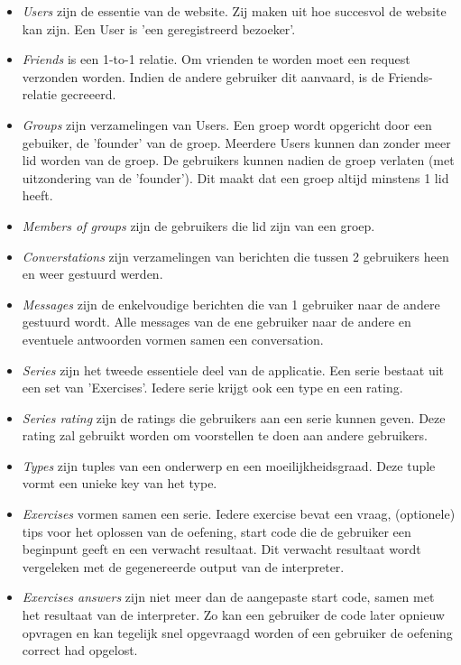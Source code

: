 \begin{itemize}
    \item \emph{Users} zijn de essentie van de website. Zij maken uit hoe succesvol de website kan zijn.
        Een User is 'een geregistreerd bezoeker'.
    \item \emph{Friends} is een 1-to-1 relatie. Om vrienden te worden moet een request verzonden worden.
        Indien de andere gebruiker dit aanvaard, is de Friends-relatie gecreeerd.
    \item \emph{Groups} zijn verzamelingen van Users. Een groep wordt opgericht door een gebuiker, de 'founder'
        van de groep. Meerdere Users kunnen dan zonder meer lid worden van de groep. De gebruikers kunnen
        nadien de groep verlaten (met uitzondering van de 'founder'). Dit maakt dat een groep altijd minstens
        1 lid heeft.
    \item \emph{Members of groups} zijn de gebruikers die lid zijn van een groep.
    \item \emph{Converstations} zijn verzamelingen van berichten die tussen 2 gebruikers heen en weer gestuurd
        werden.
    \item \emph{Messages} zijn de enkelvoudige berichten die van 1 gebruiker naar de andere gestuurd wordt.
        Alle messages van de ene gebruiker naar de andere en eventuele antwoorden vormen samen een conversation.
    \item \emph{Series} zijn het tweede essentiele deel van de applicatie. Een serie bestaat uit een set
        van 'Exercises'. Iedere serie krijgt ook een type en een rating.
    \item \emph{Series rating} zijn de ratings die gebruikers aan een serie kunnen geven. Deze rating
        zal gebruikt worden om voorstellen te doen aan andere gebruikers.
    \item \emph{Types} zijn tuples van een onderwerp en een moeilijkheidsgraad. Deze tuple vormt een
        unieke key van het type.
    \item \emph{Exercises} vormen samen een serie. Iedere exercise bevat een vraag, (optionele) tips voor
        het oplossen van de oefening, start code die de gebruiker een beginpunt geeft en een verwacht resultaat.
        Dit verwacht resultaat wordt vergeleken met de gegenereerde output van de interpreter.
    \item \emph{Exercises answers} zijn niet meer dan de aangepaste start code, samen met het resultaat
        van de interpreter. Zo kan een gebruiker de code later opnieuw opvragen en kan tegelijk snel
        opgevraagd worden of een gebruiker de oefening correct had opgelost.
\end{itemize}
